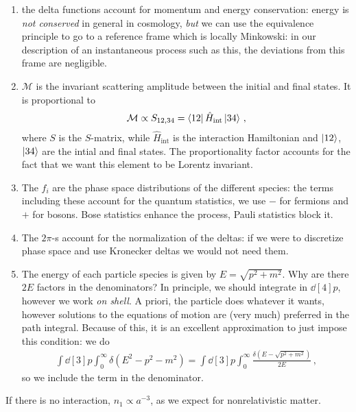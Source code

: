 \documentclass[main.tex]{subfiles}
\begin{document}
\begin{enumerate}
  \item the delta functions account for momentum and energy conservation: energy is \emph{not conserved} in general in cosmology, \emph{but} we can use the equivalence principle to go to a reference frame which is locally Minkowski: in our description of an instantaneous process such as this, the deviations from this frame are negligible.
  \item \(\mathcal{M}\) is the invariant scattering amplitude between the initial and final states. It is proportional to 
  \begin{align}
  \mathcal{M} \propto S_{12, 34} = \bra{12} \hat{H} _{\text{int}} \ket{34}
  \,,
  \end{align}
  where \(S\) is the \(S\)-matrix, while \(\hat{H}_{\text{int}}\) is the interaction Hamiltonian and \(\ket{12}\), \(\ket{34}\) are the intial and final states. 
  The proportionality factor accounts for the fact that we want this element to be Lorentz invariant.
  \item The \(f_{i}\) are the phase space distributions of the different species: the terms including these account for the quantum statistics, we use \(-\) for fermions and \(+\) for bosons. Bose statistics enhance the process, Pauli statistics block it. 
  \item The \(2\pi \)-s account for the normalization of the deltas: if we were to discretize phase space and use Kronecker deltas we would not need them. 
  \item The energy of each particle species is given by  \(E = \sqrt{p^2+m^2}\). 
  Why are there \(2E\) factors in the denominators? In principle, we should integrate in \(\dd[4]{p}\), however we work \emph{on shell}. A priori, the particle does whatever it wants, however solutions to the equations of motion are (very much) preferred in the path integral.
  Because of this, it is an excellent approximation to just impose this condition: we do 
  \begin{align}
  \int \dd[3]{p} \int_{0}^{ \infty } \delta (E^2- p^2-m^2) 
  = \int \dd[3]{p} \int_{0}^{ \infty } \frac{ \delta (E - \sqrt{p^2+m^2})}{2E}
  \,,
  \end{align}
  so we include the term in the denominator. 
\end{enumerate}


If there is no interaction, \(n_1 \propto a^{-3}\), as we expect for nonrelativistic matter. 
\end{document}
